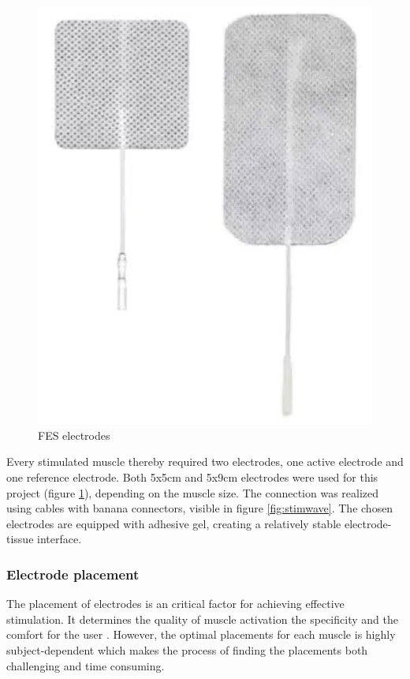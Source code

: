\begin{figure} 
    \centering
    \includegraphics[width=\linewidth]{images/electrodes.png}
    \caption{FES electrodes}
    \label{fig:electrodes}
\end{figure}

Every stimulated muscle thereby required two electrodes, one active electrode and one reference electrode. Both 5x5cm and 5x9cm electrodes were used for this project (figure \ref{fig:electrodes}), depending on the muscle size. The connection was realized using cables with banana connectors, visible in figure \ref{fig:stimwave}. The chosen electrodes are equipped with adhesive gel, creating a relatively stable electrode-tissue interface. 

\subsubsection{Electrode placement}
The placement of electrodes is an critical factor for achieving effective stimulation. It determines the quality of muscle activation the specificity and the comfort for the user . However, the optimal placements for each muscle is highly subject-dependent  which makes the process of finding the placements both challenging and time consuming.

